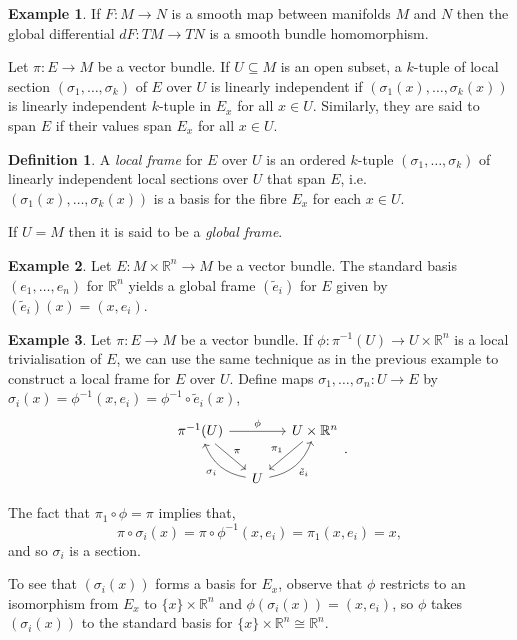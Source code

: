 \documentclass[12pt,a4paper]{article}
\numberwithin{equation}{section}
\theoremstyle{definition}
\newtheorem{definition}{Definition}[section]
\newtheorem{example}{Example}[section]
\theoremstyle{remark}
\begin{document}
\begin{example}
If $F:M\to N$ is a smooth map between manifolds $M$ and $N$ then the global differential $dF:TM\to TN$ is a smooth bundle homomorphism.
\end{example}

Let $\pi:E\to M$ be a vector bundle. If $U\subseteq M$ is an open subset, a $k$-tuple of local section $(\sigma_1,\ldots,\sigma_k)$ of $E$ over $U$ is linearly independent if $(\sigma_1(x),\ldots,\sigma_k(x))$ is linearly independent $k$-tuple in $E_x$ for all $x\in U$. Similarly, they are said to span $E$ if their values span $E_x$ for all $x\in U$.

\begin{definition}
A \textit{local frame} for $E$ over $U$ is an ordered $k$-tuple $(\sigma_1,\ldots,\sigma_k)$ of linearly independent local sections over $U$ that span $E$, i.e. $(\sigma_1(x),\ldots,\sigma_k(x))$ is a basis for the fibre $E_x$ for each $x\in U$.

If $U=M$ then it is said to be a \textit{global frame}.
\end{definition}
\begin{example}
Let $E:M\times\mathbb{R}^n\to M$ be a vector bundle. The standard basis $(e_1,\ldots,e_n)$ for $\mathbb{R}^n$ yields a global frame $(\tilde{e}_i)$ for $E$ given by $(\tilde{e}_i)(x)=(x,e_i)$.
\end{example}
\begin{example}
Let $\pi:E\to M$ be a vector bundle. If $\phi:\pi^{-1}(U)\to U\times \mathbb{R}^n$ is a local trivialisation of $E$, we can use the same technique as in the previous example to construct a local frame for $E$ over $U$. Define maps $\sigma_1,\ldots,\sigma_n: U\to E$ by $\sigma_i(x)=\phi^{-1}(x,e_i)=\phi^{-1}\circ\tilde{e}_i(x)$,
\[
\begin{tikzcd}[column sep=small]
\pi^{-1}(U) \arrow{dr}{\pi} \arrow{rr}{\phi} && U\times\mathbb{R}^n \arrow{dl}[swap]{\pi_1}\\
&U \arrow[ul, bend left, "\sigma_i"] \arrow[ur, bend right,swap,"\tilde{e}_i"]
\end{tikzcd}.
\]

The fact that $\pi_1\circ\phi=\pi$ implies that,
\[
\pi\circ\sigma_i(x)=\pi\circ\phi^{-1}(x,e_i)=\pi_1(x,e_i)=x,
\]
and so $\sigma_i$ is a section.

To see that $(\sigma_i(x))$ forms a basis for $E_x$, observe that $\phi$ restricts to an isomorphism from $E_x$ to $\{x\}\times\mathbb{R}^n$ and $\phi(\sigma_i(x))=(x,e_i)$, so $\phi$ takes $(\sigma_i(x))$ to the standard basis for $\{x\}\times\mathbb{R}^n\cong\mathbb{R}^n$.
\end{example}
\end{document}
